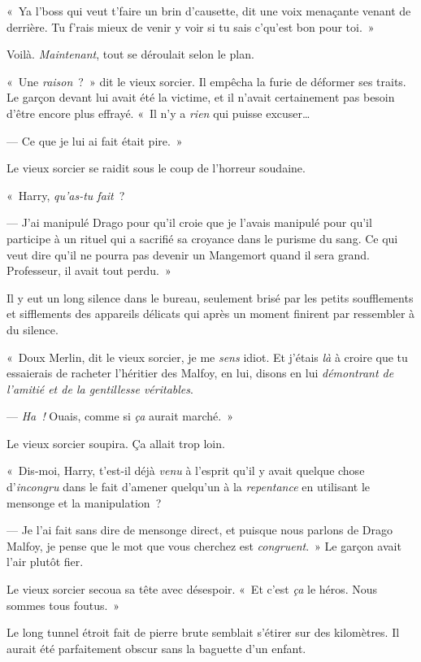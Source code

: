 «~Ya l'boss qui veut t'faire un brin d'causette, dit une voix menaçante venant de derrière. Tu f'rais mieux de venir y voir si tu sais c'qu'est bon pour toi.~»

Voilà. \emph{Maintenant}, tout se déroulait selon le plan.


«~Une \emph{raison}~?~» dit le vieux sorcier. Il empêcha la furie de déformer ses traits. Le garçon devant lui avait été la victime, et il n'avait certainement pas besoin d'être encore plus effrayé. «~Il n'y a \emph{rien} qui puisse excuser…

--- Ce que je lui ai fait était pire.~»

Le vieux sorcier se raidit sous le coup de l'horreur soudaine.

«~Harry, \emph{qu'as-tu fait}~?

--- J'ai manipulé Drago pour qu'il croie que je l'avais manipulé pour qu'il participe à un rituel qui a sacrifié sa croyance dans le purisme du sang. Ce qui veut dire qu'il ne pourra pas devenir un Mangemort quand il sera grand. Professeur, il avait tout perdu.~»

Il y eut un long silence dans le bureau, seulement brisé par les petits soufflements et sifflements des appareils délicats qui après un moment finirent par ressembler à du silence.

«~Doux Merlin, dit le vieux sorcier, je me \emph{sens} idiot. Et j'étais \emph{là} à croire que tu essaierais de racheter l'héritier des Malfoy, en lui, disons en lui \emph{démontrant de l'amitié et de la gentillesse véritables}.

--- \emph{Ha~!} Ouais, comme si \emph{ça} aurait marché.~»

Le vieux sorcier soupira. Ça allait trop loin.

«~Dis-moi, Harry, t'est-il déjà \emph{venu} à l'esprit qu'il y avait quelque chose d'\emph{incongru} dans le fait d'amener quelqu'un à la \emph{repentance} en utilisant le mensonge et la manipulation~?

--- Je l'ai fait sans dire de mensonge direct, et puisque nous parlons de Drago Malfoy, je pense que le mot que vous cherchez est \emph{congruent}.~» Le garçon avait l'air plutôt fier.

Le vieux sorcier secoua sa tête avec désespoir. «~Et c'est \emph{ça} le héros. Nous sommes tous foutus.~»


Le long tunnel étroit fait de pierre brute semblait s'étirer sur des kilomètres. Il aurait été parfaitement obscur sans la baguette d'un enfant.

